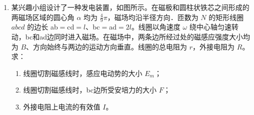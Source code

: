 \documentclass[\gkver]{gaokaozhenti}
\begin{document}
\begin{enumerate}
\item
某兴趣小组设计了一种发电装置，如图所示。在磁极和圆柱状铁芯之间形成的两磁场区域的圆心角 $\alpha$ 均为 $\frac{4}{9}\pi$，磁场均沿半径方向．匝数为 $N$ 的矩形线圈 $abcd$ 的边长 ab$=$cd$=l$、bc$=$ad$=2l$。线圈以角速度 $\omega$ 绕中心轴匀速转动，bc和ad边同时进入磁场。在磁场中，两条边所经过处的磁感应强度大小均为 $B$、方向始终与两边的运动方向垂直。线圈的总电阻为 $r$，外接电阻为 $R$。求：
\begin{enumerate}
	\item
	线圈切割磁感线时，感应电动势的大小 $E_{m}$；
	\item
	线圈切割磁感线时，bc边所受安培力的大小 $F$；
	\item
	外接电阻上电流的有效值 $I$。
\end{enumerate}


\end{enumerate}
\end{document}
